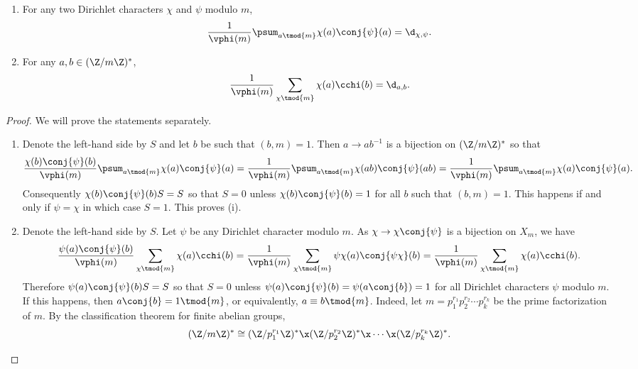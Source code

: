       \begin{proposition}\label{prop:Dirichlet_orthogonality_relations}
      \phantom{ }
        \begin{enumerate}[label=(\roman*)]
          \item For any two Dirichlet characters $\chi$ and $\psi$ modulo $m$,
          \[
            \frac{1}{\vphi(m)}\psum_{a \tmod{m}}\chi(a)\conj{\psi}(a) = \d_{\chi,\psi}.
          \]
          \item For any $a,b \in (\Z/m\Z)^{\ast}$,
          \[
            \frac{1}{\vphi(m)}\sum_{\chi \tmod{m}}\chi(a)\cchi(b) = \d_{a,b}.
          \]
        \end{enumerate}
      \end{proposition}
      \begin{proof}
        We will prove the statements separately.
        \begin{enumerate}[label=(\roman*)]
          \item Denote the left-hand side by $S$ and let $b$ be such that $(b,m) = 1$. Then $a \to ab^{-1}$ is a bijection on $(\Z/m\Z)^{\ast}$ so that
          \[
            \frac{\chi(b)\conj{\psi}(b)}{\vphi(m)}\psum_{a \tmod{m}}\chi(a)\conj{\psi}(a) = \frac{1}{\vphi(m)}\psum_{a \tmod{m}}\chi(ab)\conj{\psi}(ab) = \frac{1}{\vphi(m)}\psum_{a \tmod{m}}\chi(a)\conj{\psi}(a).
          \]
          Consequently $\chi(b)\conj{\psi}(b)S = S$ so that $S = 0$ unless $\chi(b)\conj{\psi}(b) = 1$ for all $b$ such that $(b,m) = 1$. This happens if and only if $\psi = \chi$ in which case $S = 1$. This proves (i).
          \item Denote the left-hand side by $S$. Let $\psi$ be any Dirichlet character modulo $m$. As $\chi \to \chi\conj{\psi}$ is a bijection on $X_{m}$, we have
          \[
            \frac{\psi(a)\conj{\psi}(b)}{\vphi(m)}\sum_{\chi \tmod{m}}\chi(a)\cchi(b) = \frac{1}{\vphi(m)}\sum_{\chi \tmod{m}}\psi\chi(a)\conj{\psi\chi}(b) = \frac{1}{\vphi(m)}\sum_{\chi \tmod{m}}\chi(a)\cchi(b).
          \]
          Therefore $\psi(a)\conj{\psi}(b)S = S$ so that $S = 0$ unless $\psi(a)\conj{\psi}(b) = \psi(a\conj{b}) = 1$ for all Dirichlet characters $\psi$ modulo $m$. If this happens, then $a\conj{b} = 1 \tmod{m}$, or equivalently, $a \equiv b \tmod{m}$. Indeed, let $m = p_{1}^{r_{1}}p_{2}^{r_{2}} \cdots p_{k}^{r_{k}}$ be the prime factorization of $m$. By the classification theorem for finite abelian groups,
          \[
            (\Z/m\Z)^{\ast} \cong (\Z/p_{1}^{r_{1}}\Z)^{\ast} \x (\Z/p_{2}^{r_{2}}\Z)^{\ast} \x \cdots \x (\Z/p_{k}^{r_{k}}\Z)^{\ast}.
\]
\end{enumerate}
\end{proof}
